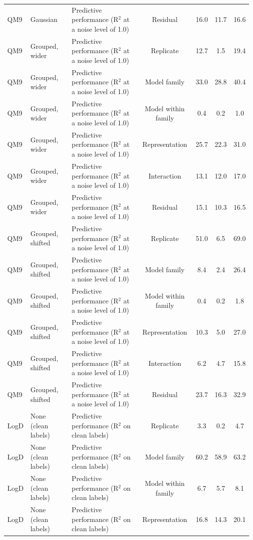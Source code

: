 \begin{landscape}
{\begin{longtable}{lllcccc}
QM9 & Gaussian & Predictive performance (R$^2$ at a noise level of 1.0) & Residual & 16.0 & 11.7 & 16.6 \\
QM9 & Grouped, wider & Predictive performance (R$^2$ at a noise level of 1.0) & Replicate & 12.7 & 1.5 & 19.4 \\
QM9 & Grouped, wider & Predictive performance (R$^2$ at a noise level of 1.0) & Model family & 33.0 & 28.8 & 40.4 \\
QM9 & Grouped, wider & Predictive performance (R$^2$ at a noise level of 1.0) & Model within family & 0.4 & 0.2 & 1.0 \\
QM9 & Grouped, wider & Predictive performance (R$^2$ at a noise level of 1.0) & Representation & 25.7 & 22.3 & 31.0 \\
QM9 & Grouped, wider & Predictive performance (R$^2$ at a noise level of 1.0) & Interaction & 13.1 & 12.0 & 17.0 \\
QM9 & Grouped, wider & Predictive performance (R$^2$ at a noise level of 1.0) & Residual & 15.1 & 10.3 & 16.5 \\
QM9 & Grouped, shifted & Predictive performance (R$^2$ at a noise level of 1.0) & Replicate & 51.0 & 6.5 & 69.0 \\
QM9 & Grouped, shifted & Predictive performance (R$^2$ at a noise level of 1.0) & Model family & 8.4 & 2.4 & 26.4 \\
QM9 & Grouped, shifted & Predictive performance (R$^2$ at a noise level of 1.0) & Model within family & 0.4 & 0.2 & 1.8 \\
QM9 & Grouped, shifted & Predictive performance (R$^2$ at a noise level of 1.0) & Representation & 10.3 & 5.0 & 27.0 \\
QM9 & Grouped, shifted & Predictive performance (R$^2$ at a noise level of 1.0) & Interaction & 6.2 & 4.7 & 15.8 \\
QM9 & Grouped, shifted & Predictive performance (R$^2$ at a noise level of 1.0) & Residual & 23.7 & 16.3 & 32.9 \\
LogD & None (clean labels) & Predictive performance (R$^2$ on clean labels) & Replicate & 3.3 & 0.2 & 4.7 \\
LogD & None (clean labels) & Predictive performance (R$^2$ on clean labels) & Model family & 60.2 & 58.9 & 63.2 \\
LogD & None (clean labels) & Predictive performance (R$^2$ on clean labels) & Model within family & 6.7 & 5.7 & 8.1 \\
LogD & None (clean labels) & Predictive performance (R$^2$ on clean labels) & Representation & 16.8 & 14.3 & 20.1 \\

\end{longtable}}
\end{landscape}
